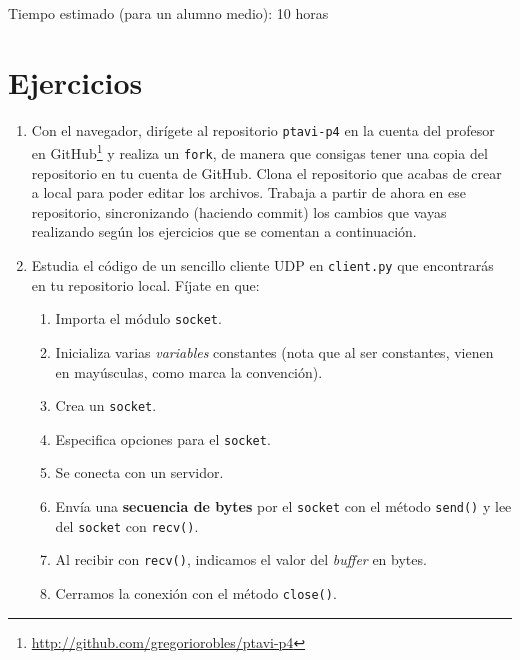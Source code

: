 \documentclass[11pt,a4paper]{article}
\begin{document}
Tiempo estimado (para un alumno medio): 10 horas

\section{Ejercicios}

\begin{enumerate}

  \item Con el navegador, dirígete al repositorio \texttt{ptavi-p4} en la cuenta del profesor en GitHub\footnote{\url{http://github.com/gregoriorobles/ptavi-p4}} y realiza un \texttt{fork}, de manera que consigas tener una copia del repositorio en tu cuenta de GitHub. Clona el repositorio que acabas de crear a local para poder editar los archivos. Trabaja a partir de ahora en ese repositorio, sincronizando (haciendo commit) los cambios que vayas realizando según los ejercicios que se comentan a continuación.

  \item Estudia el código de un sencillo cliente UDP en \texttt{client.py} que encontrarás en tu repositorio local. Fíjate en que:
  \begin{enumerate}
    \item Importa el módulo \texttt{socket}.
    \item Inicializa varias \emph{variables} constantes (nota que al ser constantes, vienen en mayúsculas, como marca la convención).
    \item Crea un \texttt{socket}.
    \item Especifica opciones para el \texttt{socket}.
    \item Se conecta con un servidor.
    \item Envía una {\bf secuencia de bytes} por el \texttt{socket} con el método \texttt{send()} y lee del \texttt{socket} con \texttt{recv()}.
    \item Al recibir con \texttt{recv()}, indicamos el valor del \emph{buffer} en bytes.
    \item Cerramos la conexión con el método \texttt{close()}.
  \end{enumerate}



\end{enumerate}
\end{document}
